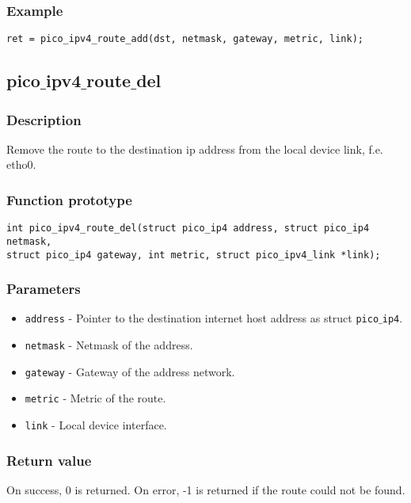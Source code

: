 \subsubsection*{Example}
\begin{verbatim}
ret = pico_ipv4_route_add(dst, netmask, gateway, metric, link);
\end{verbatim}



\subsection{pico$\_$ipv4$\_$route$\_$del}

\subsubsection*{Description}
Remove the route to the destination ip address from the local device link, f.e. etho0.

\subsubsection*{Function prototype}
\begin{verbatim}
int pico_ipv4_route_del(struct pico_ip4 address, struct pico_ip4 netmask,
struct pico_ip4 gateway, int metric, struct pico_ipv4_link *link); 
\end{verbatim}

\subsubsection*{Parameters}
\begin{itemize}[noitemsep]
\item \texttt{address} - Pointer to the destination internet host address as struct \texttt{pico$\_$ip4}.
\item \texttt{netmask} - Netmask of the address.
\item \texttt{gateway} - Gateway of the address network.
\item \texttt{metric} - Metric of the route.
\item \texttt{link} - Local device interface.
\end{itemize}

\subsubsection*{Return value}
On success, 0 is returned. On error, -1 is returned if the route could not be found.

